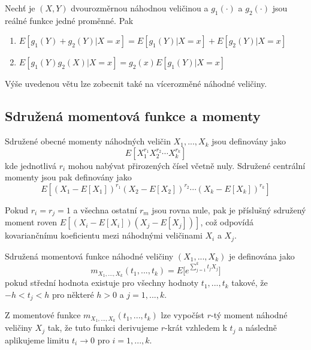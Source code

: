 \begin{theorem}
Nechť je $(X,Y)$ dvourozměrnou náhodnou veličinou a $g_1(\cdot)$ a $g_2(\cdot)$ jsou reálné funkce jedné proměnné. Pak
\begin{enumerate}
\item $E[g_1(Y) + g_2(Y)|X = x] = E[g_1(Y)|X = x] + E[g_2(Y)|X = x]$
\item $E[g_1(Y)g_2(X)|X = x] = g_2(x)E[g_1(Y)|X = x]$
\end{enumerate}
\end{theorem}
Výše uvedenou větu lze zobecnit také na vícerozměné náhodné veličiny.

\subsection{Sdružená momentová funkce a momenty}

\begin{definition}
Sdružené obecné momenty náhodných veličin $X_1, ..., X_k$ jsou definovány jako
\begin{equation*}
E[X_1^{r_1}X_2^{r_2} \cdots X_k^{r_k}]
\end{equation*}
kde jednotlivá $r_i$ mohou nabývat přirozených čísel včetně nuly. Sdružené centrální momenty jsou pak definovány jako
\begin{equation*}
E[(X_1 - E[X_1])^{r_1}(X_2 - E[X_2])^{r_2} \cdots (X_k - E[X_k])^{r_k}]
\end{equation*}
\end{definition}

Pokud $r_i = r_j = 1$ a všechna ostatní $r_m$ jsou rovna nule, pak je příslušný sdružený moment roven $E[(X_i - E[X_i])(X_j - E[X_j])]$, což odpovídá kovariančnímu koeficientu mezi náhodnými veličinami $X_i$ a $X_j$.

\begin{definition}
Sdružená momentová funkce náhodné veličiny $(X_1, ..., X_k)$ je definována jako
\begin{equation*}
m_{X_1, ..., X_k}(t_1, ..., t_k) = E \Big[e^{\sum_{j = 1}^k t_j X_j} \Big]
\end{equation*}
pokud střední hodnota existuje pro všechny hodnoty $t_1, ..., t_k$ takové, že $-h < t_j < h$ pro některé $h > 0$ a $j = 1, ..., k$.
\end{definition}

Z momentové funkce $m_{X_1, ..., X_k}(t_1, ..., t_k)$ lze vypočíst $r$-tý moment náhodné veličiny $X_j$ tak, že tuto funkci derivujeme $r$-krát vzhledem k $t_j$ a následně aplikujeme limitu $t_i \rightarrow 0$ pro $i = 1, ..., k$.

